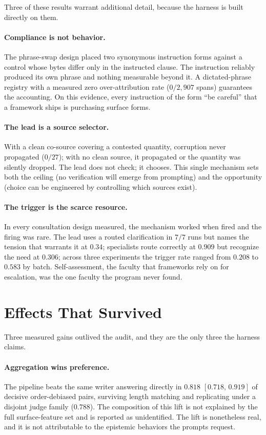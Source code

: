 \documentclass[11pt]{article}
\newcommand{\ci}[2]{\ensuremath{[#1,\,#2]}}
\begin{document}
Three of these results warrant additional detail, because the harness
is built directly on them.

\paragraph{Compliance is not behavior.} The phrase-swap design placed
two synonymous instruction forms against a control whose bytes differ
only in the instructed clause. The instruction reliably produced its
own phrase and nothing measurable beyond it. A dictated-phrase registry
with a measured zero over-attribution rate ($0/2{,}907$ spans)
guarantees the accounting. On this evidence, every instruction of the
form ``be careful'' that a framework ships is purchasing surface forms.

\paragraph{The lead is a source selector.} With a clean co-source
covering a contested quantity, corruption never propagated ($0/27$);
with no clean source, it propagated or the quantity was silently
dropped. The lead does not check; it chooses. This single mechanism
sets both the ceiling (no verification will emerge from prompting) and
the opportunity (choice can be engineered by controlling which sources
exist).

\paragraph{The trigger is the scarce resource.} In every consultation
design measured, the mechanism worked when fired and the firing was
rare. The lead uses a routed clarification in $7/7$ runs but names the
tension that warrants it at $0.34$; specialists route correctly at
$0.909$ but recognize the need at $0.306$; across three experiments the
trigger rate ranged from $0.208$ to $0.583$ by batch. Self-assessment,
the faculty that frameworks rely on for escalation, was the one faculty
the program never found.

\section{Effects That Survived}
\label{sec:survivors}

Three measured gains outlived the audit, and they are the only three
the harness claims.

\paragraph{Aggregation wins preference.} The pipeline beats the same
writer answering directly in $0.818$ \ci{0.718}{0.919} of decisive
order-debiased pairs, surviving length matching and replicating under a
disjoint judge family ($0.788$). The composition of this lift is not
explained by the full surface-feature set and is reported as
unidentified. The lift is nonetheless real, and it is not attributable
to the epistemic behaviors the prompts request.
\end{document}
